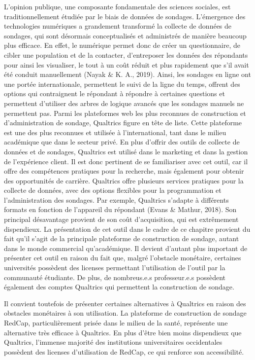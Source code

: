 \documentclass[
  letterpaper,
  DIV=11,
  numbers=noendperiod]{scrreprt}
\begin{document}
L'opinion publique, une composante fondamentale des sciences sociales,
est traditionnellement étudiée par le biais de données de sondages.
L'émergence des technologies numériques a grandement transformé la
collecte de données de sondages, qui sont désormais conceptualisés et
administrés de manière beaucoup plus efficace. En effet, le numérique
permet donc de créer un questionnaire, de cibler une population et de la
contacter, d'entreposer les données des répondants pour ainsi les
visualiser, le tout à un coût réduit et plus rapidement que s'il avait
été conduit manuellement (Nayak \& K. A., 2019). Ainsi, les sondages en
ligne ont une portée internationale, permettent le suivi de la ligne du
temps, offrent des options qui contraignent le répondant à répondre à
certaines questions et permettent d'utiliser des arbres de logique
avancés que les sondages manuels ne permettent pas. Parmi les
plateformes web les plus reconnues de construction et d'administration
de sondage, Qualtrics figure en tête de liste. Cette plateforme est une
des plus reconnues et utilisée à l'international, tant dans le milieu
académique que dans le secteur privé. En plus d'offrir des outils de
collecte de données et de sondages, Qualtrics est utilisé dans le
marketing et dans la gestion de l'expérience client. Il est donc
pertinent de se familiariser avec cet outil, car il offre des
compétences pratiques pour la recherche, mais également pour obtenir des
opportunités de carrière. Qualtrics offre plusieurs services pratiques
pour la collecte de données, avec des options flexibles pour la
programmation et l'administration des sondages. Par exemple, Qualtrics
s'adapte à différents formats en fonction de l'appareil du répondant
(Evans \& Mathur, 2018). Son principal désavantage provient de son coût
d'acquisition, qui est extrêmement dispendieux. La présentation de cet
outil dans le cadre de ce chapitre provient du fait qu'il s'agit de la
principale plateforme de construction de sondage, autant dans le monde
commercial qu'académique. Il devient d'autant plus important de
présenter cet outil en raison du fait que, malgré l'obstacle monétaire,
certaines universités possèdent des licenses permettant l'utilisation de
l'outil par la communauté étudiante. De plus, de nombreus.e.s
professeur.e.s possèdent également des comptes Qualtrics qui permettent
la construction de sondage.

Il convient toutefois de présenter certaines alternatives à Qualtrics en
raison des obstacles monétaires à son utilisation. La plateforme de
construction de sondage RedCap, particulièrement prisée dans le milieu
de la santé, représente une alternative très efficace à Qualtrics. En
plus d'être bien moins dispendieux que Qualtrics, l'immense majorité des
institutions universitaires occidentales possèdent des licenses
d'utilisation de RedCap, ce qui renforce son accessibilité.
\end{document}
